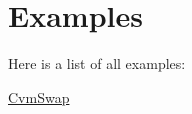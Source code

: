 \section{Examples}
Here is a list of all examples\-:\begin{DoxyCompactItemize}
\item 
\hyperlink{_cvm_swap-example}{Cvm\-Swap}
\end{DoxyCompactItemize}
